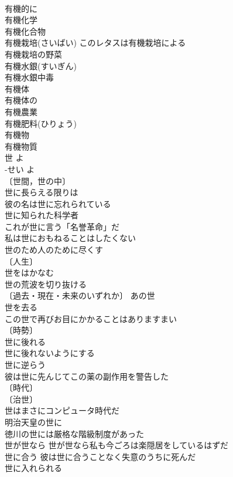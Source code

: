 \documentclass[8pt]{extreport}
\begin{document}
\begin{CJK}{UTF8}{min}
\\	有機的に 
\\	有機化学 
\\	有機化合物 
\\	有機栽培(さいばい) このレタスは有機栽培による 
\\	有機栽培の野菜 
\\	有機水銀(すいぎん) 
\\	有機水銀中毒 
\\	有機体 
\\	有機体の 
\\	有機農業 
\\	有機肥料(ひりょう) 
\\	有機物 
\\	有機物質 
\\	世	よ 
\\	-せい	よ 
\\	〔世間，世の中〕
\\	世に長らえる限りは 
\\	彼の名は世に忘れられている 
\\	世に知られた科学者 
\\	これが世に言う「名誉革命」だ 
\\	私は世におもねることはしたくない 
\\	世のため人のために尽くす 
\\	〔人生〕
\\	世をはかなむ 
\\	世の荒波を切り抜ける 
\\	〔過去・現在・未来のいずれか〕 あの世 
\\	世を去る 
\\	この世で再びお目にかかることはありますまい 
\\	〔時勢〕
\\	世に後れる 
\\	世に後れないようにする 
\\	世に逆らう 
\\	彼は世に先んじてこの薬の副作用を警告した 
\\	〔時代〕
\\	〔治世〕
\\	世はまさにコンピュータ時代だ 
\\	明治天皇の世に 
\\	徳川の世には厳格な階級制度があった 
\\	世が世なら 世が世なら私も今ごろは楽隠居をしているはずだ 
\\	世に合う 彼は世に合うことなく失意のうちに死んだ 
\\	世に入れられる 

\end{CJK}
\end{document}
